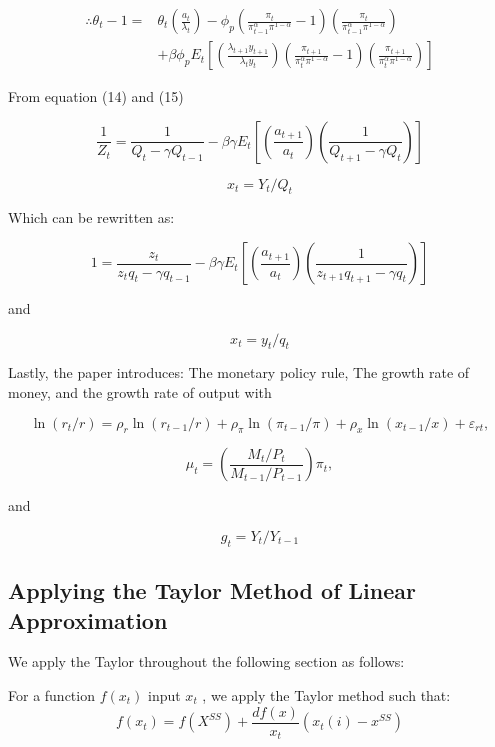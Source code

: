 \documentclass[11pt,preprint, authoryear]{elsarticle}
\numberwithin{equation}{section}
\numberwithin{figure}{section}
\numberwithin{table}{section}
\begin{document}
\[\begin{aligned} \therefore \theta_{t}-1=& \theta_{t}\left(\frac{a_{t}}{\lambda_{t}}\right)-\phi_{p}\left(\frac{\pi_{t}}{\pi_{t-1}^{\alpha} \pi^{1-\alpha}}-1\right)\left(\frac{\pi_{t}}{\pi_{t-1}^{\alpha} \pi^{1-\alpha}}\right) \\
&+\beta \phi_{p} E_{t}\left[\left(\frac{\lambda_{t+1} y_{t+1}}{\lambda_{t} y_{t}}\right)\left(\frac{\pi_{t+1}}{\pi_{t}^{\alpha} \pi^{1-\alpha}}-1\right)\left(\frac{\pi_{t+1}}{\pi_{t}^{\alpha} \pi^{1-\alpha}}\right)\right]
\end{aligned} \tag{13*}\]

From equation (14) and (15)

\[\frac{1}{Z_{t}}=\frac{1}{Q_{t}-\gamma Q_{t-1}}-\beta \gamma E_{t}\left[\left(\frac{a_{t+1}}{a_{t}}\right)\left(\frac{1}{Q_{t+1}-\gamma Q_{t}}\right)\right] \tag{14}\]

\[x_t = Y_t/Q_t \tag{15}\]

Which can be rewritten as:

\[1=\frac{z_{t}}{z_{t} q_{t}-\gamma q_{t-1}}-\beta \gamma E_{t}\left[\left(\frac{a_{t+1}}{a_{t}}\right)\left(\frac{1}{z_{t+1} q_{t+1}-\gamma q_{t}}\right)\right] \tag{14*}\]

and

\[x_t = y_t/q_t \tag{15*}\]

Lastly, the paper introduces: The monetary policy rule, The growth rate
of money, and the growth rate of output with

\[\ln \left(r_{t} / r\right)=\rho_{r} \ln \left(r_{t-1} / r\right)+\rho_{\pi} \ln \left(\pi_{t-1} / \pi\right)+\rho_{x} \ln \left(x_{t-1} / x\right)+\varepsilon_{r t}, \tag{16*}\]

\[\mu_{t}=\left(\frac{M_{t} / P_{t}}{M_{t-1} / P_{t-1}}\right) \pi_{t}, \tag{17*}\]

and

\[g_{t}=Y_{t} / Y_{t-1} \tag{18*}\]

\hypertarget{applying-the-taylor-method-of-linear-approximation}{%
\subsection{Applying the Taylor Method of Linear
Approximation}\label{applying-the-taylor-method-of-linear-approximation}}

We apply the Taylor throughout the following section as follows:

For a function \(f(x_t)\) input \(x_t\) , we apply the Taylor method
such that: \[f(x_t) = f(X^{SS}) + \frac{df(x)}{x_t} (x_t(i) - x^{SS})\]
\end{document}

